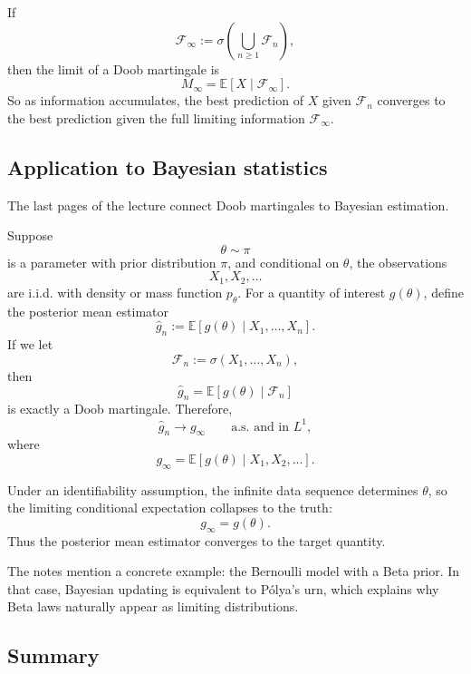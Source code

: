 \documentclass[11pt]{article}
\theoremstyle{definition}
\begin{document}
If
\[
\mathcal F_\infty := \sigma\!\left(\bigcup_{n\ge 1}\mathcal F_n\right),
\]
then the limit of a Doob martingale is
\[
M_\infty = \mathbb E[X\mid \mathcal F_\infty].
\]
So as information accumulates, the best prediction of \(X\) given \(\mathcal F_n\) converges to the best prediction given the full limiting information \(\mathcal F_\infty\).

\subsection{Application to Bayesian statistics}

The last pages of the lecture connect Doob martingales to Bayesian estimation.

Suppose
\[
\theta \sim \pi
\]
is a parameter with prior distribution \(\pi\), and conditional on \(\theta\), the observations
\[
X_1,X_2,\dots
\]
are i.i.d. with density or mass function \(p_\theta\). For a quantity of interest \(g(\theta)\), define the posterior mean estimator
\[
\hat g_n := \mathbb E[g(\theta)\mid X_1,\dots,X_n].
\]
If we let
\[
\mathcal F_n := \sigma(X_1,\dots,X_n),
\]
then
\[
\hat g_n = \mathbb E[g(\theta)\mid \mathcal F_n]
\]
is exactly a Doob martingale. Therefore,
\[
\hat g_n \to g_\infty
\qquad \text{a.s. and in } L^1,
\]
where
\[
g_\infty = \mathbb E[g(\theta)\mid X_1,X_2,\dots].
\]

Under an identifiability assumption, the infinite data sequence determines \(\theta\), so the limiting conditional expectation collapses to the truth:
\[
g_\infty = g(\theta).
\]
Thus the posterior mean estimator converges to the target quantity.

The notes mention a concrete example: the Bernoulli model with a Beta prior. In that case, Bayesian updating is equivalent to P\'olya's urn, which explains why Beta laws naturally appear as limiting distributions.

\subsection{Summary}
\end{document}
